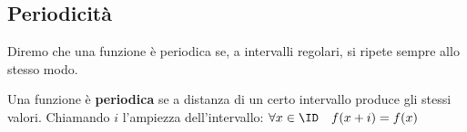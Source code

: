 % 
% 
% 
% 
%               
% 
% 
% 
%               
% 
% 
% 
%               
%               
% 
% 


\subsection{Periodicità}

\noindent Diremo che una funzione è periodica se, a intervalli regolari, si 
ripete sempre allo stesso modo.

\begin{definizione}
Una funzione è \textbf{periodica} se a distanza di un certo intervallo produce 
gli stessi valori.
Chiamando \(i\) l'ampiezza dell'intervallo: \quad  
\(\forall x \in \ID \quad  f(x + i) = f(x)\)
\end{definizione}

